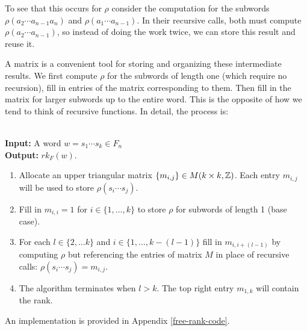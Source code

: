 \documentclass[12pt]{thesis}
\begin{document}
To see that this occurs for $\rho$
consider the computation for the subwords $\rho( a_{2} \cdots a_{n - 1} a_{n} )$ and $\rho(  a_{1} \cdots a_{n - 1} )$.
In their recursive calls, both must compute $\rho( a_{2} \cdots a_{n - 1})$, so instead of doing
the work twice, we can store this result and reuse it. 

A matrix is a convenient tool for storing and organizing these intermediate results.
We first compute $\rho$ for the subwords
of length one (which require no recursion), fill in entries of the matrix corresponding to them.
Then fill in the matrix for larger subwords up to the entire word.
This is the opposite of how we tend to think of recursive functions.
In detail, the process is: 

\begin{algorithm}
    ~ \\
    \textbf{Input:} A word $w = s_{1} \cdots s_{k} \in F_{n}$
    ~\\
    \textbf{Output:} $rk_{F}(w)$. 

\begin{enumerate}
    \item Allocate an upper triangular matrix $\{ m_{i, j} \} \in M(k \times k, \mathbb{Z})$. 
          Each entry $m_{i, j}$ will be used to store $\rho(s_{i} \cdots s_{j})$.

    \item Fill in $m_{i, i} = 1$ for $i \in \{ 1, \ldots, k \}$
           to store $\rho$ for subwords of length 1 (base case).

      \item For each $l \in \{ 2, \ldots k \}$ and $i \in \{ 1, \ldots, k - (l - 1) \}$
           fill in $m_{i, i + (l - 1)}$ by computing $\rho$ but referencing
           the entries of matrix $M$ in place of recursive calls: $\rho(s_{i} \cdots s_{j}) = m_{i, j}$.
     
    \item The algorithm terminates when $l > k$.
          The top right entry $m_{1, k}$ will contain the rank.
\end{enumerate}

\end{algorithm}

An implementation is provided in Appendix \ref{free-rank-code}.
\end{document}
